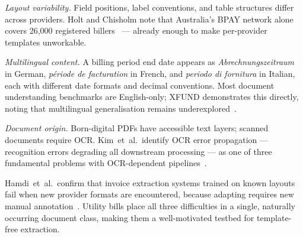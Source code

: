 \textit{Layout variability.}
Field positions, label conventions, and table structures differ across
providers.
Holt and Chisholm note that Australia's BPAY network alone covers
26,000 registered billers~\cite{Holt2018Invoices} ---
already enough to make per-provider templates unworkable.

\textit{Multilingual content.}
A billing period end date appears as \textit{Abrechnungszeitraum} in
German, \textit{p\'{e}riode de facturation} in French, and
\textit{periodo di fornitura} in Italian, each with different date
formats and decimal conventions.
Most document understanding benchmarks are English-only; XFUND
demonstrates this directly, noting that multilingual generalisation
remains underexplored~\cite{Xu2022XFUND}.

\textit{Document origin.}
Born-digital PDFs have accessible text layers; scanned documents
require OCR.
Kim~et~al.\ identify OCR error propagation --- recognition errors
degrading all downstream processing --- as one of three fundamental
problems with OCR-dependent
pipelines~\cite{Kim2022Donut}.

Hamdi~et~al.\ confirm that invoice extraction systems trained on known
layouts fail when new provider formats are encountered, because
adapting requires new manual
annotation~\cite{Hamdi2021InvoiceIE}.
Utility bills place all three difficulties in a single, naturally
occurring document class, making them a well-motivated testbed for
template-free extraction.